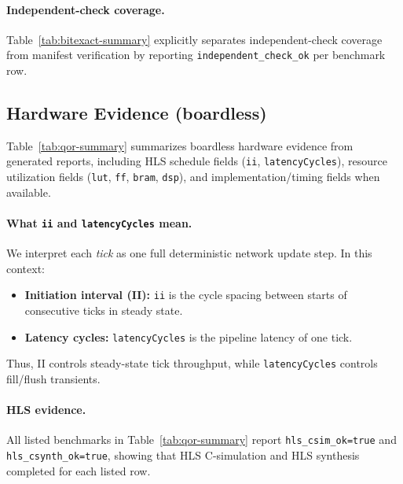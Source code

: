 \paragraph{Independent-check coverage.}
Table~\ref{tab:bitexact-summary} explicitly separates independent-check coverage from manifest verification by reporting \texttt{independent\_check\_ok} per benchmark row.

\begin{table}[t]
\centering
\scriptsize

\caption{Bit-exact summary generated from artifact evidence (source: \texttt{papers/paperA/artifacts/tables/results\_bitexact.csv}).}
\label{tab:bitexact-summary}
\end{table}

\subsection{Hardware Evidence (boardless)}
Table~\ref{tab:qor-summary} summarizes boardless hardware evidence from generated reports, including HLS schedule fields (\texttt{ii}, \texttt{latencyCycles}), resource utilization fields (\texttt{lut}, \texttt{ff}, \texttt{bram}, \texttt{dsp}), and implementation/timing fields when available.

\paragraph{What \texttt{ii} and \texttt{latencyCycles} mean.}
We interpret each \emph{tick} as one full deterministic network update step. In this context:
\begin{itemize}
\item \textbf{Initiation interval (II):} \texttt{ii} is the cycle spacing between starts of consecutive ticks in steady state.
\item \textbf{Latency cycles:} \texttt{latencyCycles} is the pipeline latency of one tick.
\end{itemize}
Thus, II controls steady-state tick throughput, while \texttt{latencyCycles} controls fill/flush transients.

\paragraph{HLS evidence.}
All listed benchmarks in Table~\ref{tab:qor-summary} report \texttt{hls\_csim\_ok=true} and \texttt{hls\_csynth\_ok=true}, showing that HLS C-simulation and HLS synthesis completed for each listed row.

